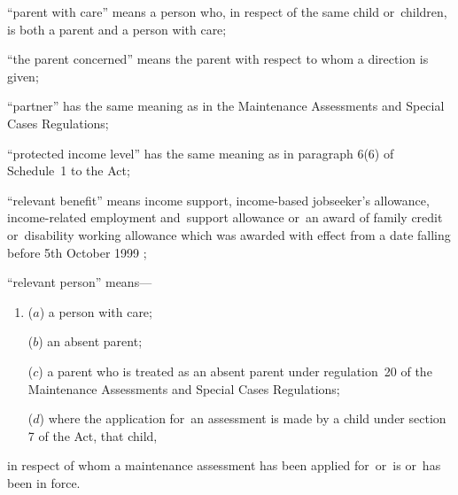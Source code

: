 \documentclass[a4paper,12pt]{article}
\begin{document}
\begin{enumerate}
“parent with care” means a person who, in respect of the same child or~children, is both a parent and a person with care;

“the parent concerned” means the parent with respect to whom a direction is given;

“partner” has the same meaning as in the Maintenance Assessments and Special Cases Regulations;

“protected income level” has the same meaning as in paragraph 6(6) of Schedule~1 to the Act;

“relevant benefit” means income support, 
income-based jobseeker’s allowance,  %
income-related employment and~support allowance  %
or~an award of family credit or~disability working allowance which was awarded with effect from a date falling before 5th October 1999%
;

“relevant person” means—
\begin{enumerate}\item[]
($a$) a person with care;

($b$) an absent parent;

($c$) a parent who is treated as an absent parent under regulation~20 of the Maintenance Assessments and Special Cases Regulations;

($d$) where the application for~an assessment is made by a child under section 7 of the Act, that child,
\end{enumerate}
in respect of whom a maintenance assessment has been applied for~or~is or~has been in force.
\end{enumerate}
\end{document}
